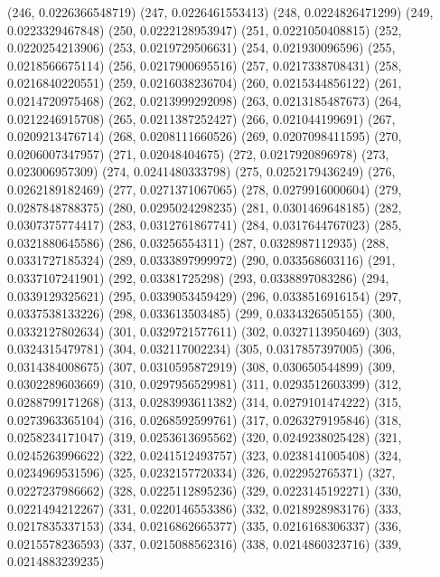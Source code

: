 {					(246, 0.0226366548719)
					(247, 0.0226461553413)
					(248, 0.0224826471299)
					(249, 0.0223329467848)
					(250, 0.0222128953947)
					(251, 0.0221050408815)
					(252, 0.0220254213906)
					(253, 0.0219729506631)
					(254, 0.021930096596)
					(255, 0.0218566675114)
					(256, 0.0217900695516)
					(257, 0.0217338708431)
					(258, 0.0216840220551)
					(259, 0.0216038236704)
					(260, 0.0215344856122)
					(261, 0.0214720975468)
					(262, 0.0213999292098)
					(263, 0.0213185487673)
					(264, 0.0212246915708)
					(265, 0.0211387252427)
					(266, 0.021044199691)
					(267, 0.0209213476714)
					(268, 0.0208111660526)
					(269, 0.0207098411595)
					(270, 0.0206007347957)
					(271, 0.02048404675)
					(272, 0.0217920896978)
					(273, 0.023006957309)
					(274, 0.0241480333798)
					(275, 0.0252179436249)
					(276, 0.0262189182469)
					(277, 0.0271371067065)
					(278, 0.0279916000604)
					(279, 0.0287848788375)
					(280, 0.0295024298235)
					(281, 0.0301469648185)
					(282, 0.0307375774417)
					(283, 0.0312761867741)
					(284, 0.0317644767023)
					(285, 0.0321880645586)
					(286, 0.03256554311)
					(287, 0.0328987112935)
					(288, 0.0331727185324)
					(289, 0.0333897999972)
					(290, 0.033568603116)
					(291, 0.0337107241901)
					(292, 0.03381725298)
					(293, 0.0338897083286)
					(294, 0.0339129325621)
					(295, 0.0339053459429)
					(296, 0.0338516916154)
					(297, 0.0337538133226)
					(298, 0.033613503485)
					(299, 0.0334326505155)
					(300, 0.0332127802634)
					(301, 0.0329721577611)
					(302, 0.0327113950469)
					(303, 0.0324315479781)
					(304, 0.032117002234)
					(305, 0.0317857397005)
					(306, 0.0314384008675)
					(307, 0.0310595872919)
					(308, 0.030650544899)
					(309, 0.0302289603669)
					(310, 0.0297956529981)
					(311, 0.0293512603399)
					(312, 0.0288799171268)
					(313, 0.0283993611382)
					(314, 0.0279101474222)
					(315, 0.0273963365104)
					(316, 0.0268592599761)
					(317, 0.0263279195846)
					(318, 0.0258234171047)
					(319, 0.0253613695562)
					(320, 0.0249238025428)
					(321, 0.0245263996622)
					(322, 0.0241512493757)
					(323, 0.0238141005408)
					(324, 0.0234969531596)
					(325, 0.0232157720334)
					(326, 0.022952765371)
					(327, 0.0227237986662)
					(328, 0.0225112895236)
					(329, 0.0223145192271)
					(330, 0.0221494212267)
					(331, 0.0220146553386)
					(332, 0.0218928983176)
					(333, 0.0217835337153)
					(334, 0.0216862665377)
					(335, 0.0216168306337)
					(336, 0.0215578236593)
					(337, 0.0215088562316)
					(338, 0.0214860323716)
					(339, 0.0214883239235)
}
